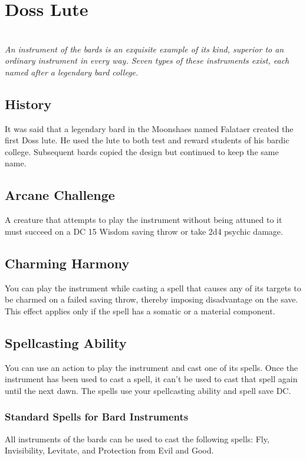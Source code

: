 \ItemSubCategory{}

\chapter*{Doss Lute}
\\

\noindent\textit{An instrument of the bards is an exquisite example of its kind, superior to an ordinary instrument in every way. Seven types of these instruments exist, each named after a legendary bard college.}

\section*{History}
It was said that a legendary bard in the Moonshaes named Falataer created the first Doss lute. He used the lute to both test and reward students of his bardic college. Subsequent bards copied the design but continued to keep the same name.

\section*{Arcane Challenge}
A creature that attempts to play the instrument without being attuned to it must succeed on a DC 15 Wisdom saving throw or take 2d4 psychic damage.

\section*{Charming Harmony}
You can play the instrument while casting a spell that causes any of its targets to be charmed on a failed saving throw, thereby imposing disadvantage on the save. This effect applies only if the spell has a somatic or a material component.

\section*{Spellcasting Ability}
You can use an action to play the instrument and cast one of its spells. Once the instrument has been used to cast a spell, it can't be used to cast that spell again until the next dawn. The spells use your spellcasting ability and spell save DC.
\subsection*{Standard Spells for Bard Instruments}
All instruments of the bards can be used to cast the following spells: Fly, Invisibility, Levitate, and Protection from Evil and Good.
